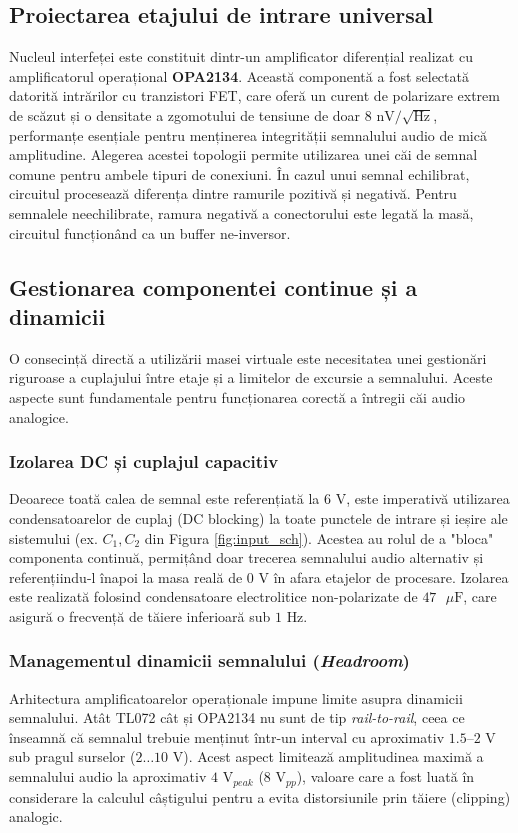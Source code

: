 \subsection{Proiectarea etajului de intrare universal}
Nucleul interfeței este constituit dintr-un amplificator diferențial realizat cu amplificatorul operațional \textbf{OPA2134}. Această componentă a fost selectată datorită intrărilor cu tranzistori FET, care oferă un curent de polarizare extrem de scăzut și o densitate a zgomotului de tensiune de doar $8\text{ nV}/\sqrt{\text{Hz}}$, performanțe esențiale pentru menținerea integrității semnalului audio de mică amplitudine. Alegerea acestei topologii permite utilizarea unei căi de semnal comune pentru ambele tipuri de conexiuni. În cazul unui semnal echilibrat, circuitul procesează diferența dintre ramurile pozitivă și negativă. Pentru semnalele neechilibrate, ramura negativă a conectorului este legată la masă, circuitul funcționând ca un buffer ne-inversor.

\subsection{Gestionarea componentei continue și a dinamicii}
O consecință directă a utilizării masei virtuale este necesitatea unei gestionări riguroase a cuplajului între etaje și a limitelor de excursie a semnalului. Aceste aspecte sunt fundamentale pentru funcționarea corectă a întregii căi audio analogice.

\subsubsection{Izolarea DC și cuplajul capacitiv}
Deoarece toată calea de semnal este referențiată la $6\text{ V}$, este imperativă utilizarea condensatoarelor de cuplaj (DC blocking) la toate punctele de intrare și ieșire ale sistemului (ex. $C_1, C_2$ din Figura \ref{fig:input_sch}). Acestea au rolul de a "bloca" componenta continuă, permițând doar trecerea semnalului audio alternativ și referențiindu-l înapoi la masa reală de $0\text{ V}$ în afara etajelor de procesare. Izolarea este realizată folosind condensatoare electrolitice non-polarizate de $47\text{ }\mu\text{F}$, care asigură o frecvență de tăiere inferioară sub $1\text{ Hz}$.

\subsubsection{Managementul dinamicii semnalului (\textit{Headroom})}
Arhitectura amplificatoarelor operaționale impune limite asupra dinamicii semnalului. Atât TL072 cât și OPA2134 nu sunt de tip \textit{rail-to-rail}, ceea ce înseamnă că semnalul trebuie menținut într-un interval cu aproximativ $1.5\text{--}2\text{ V}$ sub pragul surselor ($2\dots10\text{ V}$). Acest aspect limitează amplitudinea maximă a semnalului audio la aproximativ $4\text{ V}_{peak}$ ($8\text{ V}_{pp}$), valoare care a fost luată în considerare la calculul câștigului pentru a evita distorsiunile prin tăiere (clipping) analogic.

